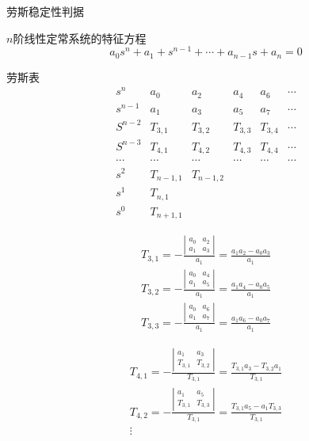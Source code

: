 \begin{frame}{劳斯稳定性判据}
\begin{block}{$n$阶线性定常系统的特征方程}
\[a_0s^n+a_1+s^{n-1}+\cdots+a_{n-1}s+a_n=0\]
\end{block}
\end{frame}
\begin{frame}
\begin{block}{劳斯表}
\begin{equation*}
\begin{array}{cccccc}
s^n&a_0&a_2&a_4&a_6&\cdots\\
s^{n-1}&a_1&a_3&a_5&a_7&\cdots\\
S^{n-2}&T_{3,1}&T_{3,2}&T_{3,3}&T_{3,4}&\cdots\\
S^{n-3}&T_{4,1}&T_{4,2}&T_{4,3}&T_{4,4}&\cdots\\
\cdots&\cdots&\cdots&\cdots&\cdots&\cdots\\
s^2&T_{n-1,1}&T_{n-1,2}\\
s^1&T_{n,1}\\
s^0&T_{n+1,1}
\end{array}
\end{equation*}
\end{block}
\end{frame}

\begin{frame}
\begin{block}{}
\begin{eqnarray*}
T_{3,1}=-\frac{\left|\begin{array}{cc}
a_0&a_2\\
a_1&a_3
\end{array}\right|}{a_1}=\frac{a_1a_2-a_0a_3}{a_1}\\
T_{3,2}=-\frac{\left|\begin{array}{cc}
a_0&a_4\\
a_1&a_5
\end{array}\right|}{a_1}=\frac{a_1a_4-a_0a_5}{a_1}\\
T_{3,3}=-\frac{\left|\begin{array}{cc}
a_0&a_6\\
a_1&a_7
\end{array}\right|}{a_1}=\frac{a_1a_6-a_0a_7}{a_1}
\end{eqnarray*}
\end{block}
\end{frame}
\begin{frame}
\begin{block}{}
\begin{eqnarray*}
T_{4,1}=-\frac{\left|\begin{array}{cc}
a_1&a_3\\
T_{3,1}&T_{3,2}
\end{array}\right|}{T_{3,1}}=\frac{T_{3,1}a_3-T_{3,2}a_1}{T_{3,1}}\\
T_{4,2}=-\frac{\left|\begin{array}{cc}
a_1&a_5\\
T_{3,1}&T_{3,3}
\end{array}\right|}{T_{3,1}}=\frac{T_{3,1}a_5-a_1T_{3,3}}{T_{3,1}}\\
\vdots
\end{eqnarray*}
\end{block}
\end{frame}

